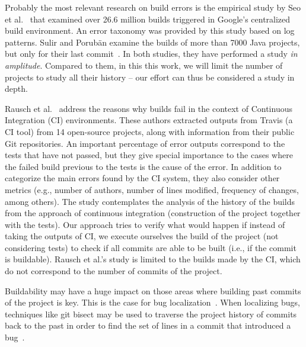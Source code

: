 Probably the most relevant research on build errors is the empirical study by Seo et al.~\cite{Seo:2014:PBE:2568225.2568255} that examined over 26.6 million builds triggered in Google's centralized build environment.
An error taxonomy was provided by this study based on log patterns.
Sulir and Porub\"an examine the builds of more than 7000 Java projects, but only for their last commit~\cite{Sulir:2016:QSJ:3001878.3001882}.
In both studies, they have performed a study \emph{in amplitude}.
Compared to them, in this this work, we will limit the number of projects to study all their history -- our effort can thus be considered a study in depth.

Rausch et al.~\cite{Rausch:2017:EAB:3104188.3104231} address the reasons why builds fail in the context of Continuous Integration (CI) environments.
These authors extracted outputs from Travis (a CI tool) from 14 open-source projects, along with information from their public Git repositories.
An important percentage of error outputs correspond to the tests that have not passed, but they give special importance to the cases where the failed build previous to the tests is the cause of the error.
In addition to categorize the main errors found by the CI system, they also consider other metrics (e.g., number of authors, number of lines modified, frequency of changes, among others).
The study contemplates the analysis of the history of the builds from the approach of continuous integration (construction of the project together with the tests).
Our approach tries to verify what would happen if instead of taking the outputs of CI, we execute ourselves the build of the project (not considering tests) to check if all commits are able to be built (i.e., if the commit is buildable).
Rausch et al.'s study is limited to the builds made by the CI, which do not correspond to the number of commits of the project.

Buildability may have a huge impact on those areas where building past commits of the project is key.
This is the case for bug localization~\cite{Sliwerski:2005:CIF:1083142.1083147,Asaduzzaman:2012:BIC:2664446.2664463, Murgia:2010:MLA:1852786.1852794, Zimmermann:2006:MVA:1137983.1138001, Zimmermann2008}.
When localizing bugs, techniques like git bisect may be used to traverse the project history of commits back to the past in order to find the set of lines in a commit that introduced a bug~\cite{spinellis2012git, meneely2013patch}.

